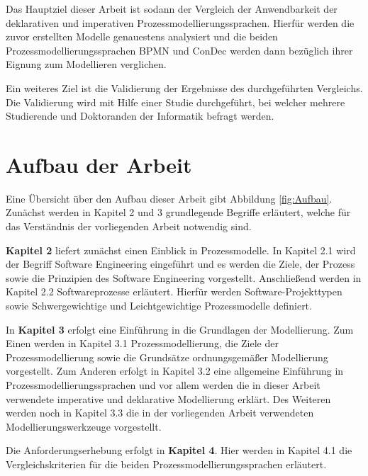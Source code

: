 Das Hauptziel dieser Arbeit ist sodann der Vergleich der Anwendbarkeit der deklarativen und imperativen Prozessmodellierungssprachen. Hierfür werden die zuvor erstellten Modelle genauestens analysiert und die beiden Prozessmodellierungssprachen BPMN und ConDec werden dann bezüglich ihrer Eignung zum Modellieren verglichen.\newline

Ein weiteres Ziel ist die Validierung der Ergebnisse des durchgeführten Vergleichs. Die Validierung wird mit Hilfe einer Studie durchgeführt, bei welcher mehrere Studierende und Doktoranden der Informatik befragt werden.\newline





\section{Aufbau der Arbeit}

Eine Übersicht über den Aufbau dieser Arbeit gibt Abbildung \ref{fig:Aufbau}.
Zunächst werden in Kapitel 2 und 3 grundlegende Begriffe erläutert, welche für das Verständnis der vorliegenden Arbeit notwendig sind.\newline

\textbf{Kapitel 2} liefert zunächst einen Einblick in Prozessmodelle. In Kapitel 2.1 wird der Begriff Software Engineering eingeführt und es werden die Ziele, der Prozess sowie die Prinzipien des Software Engineering vorgestellt. Anschließend werden in Kapitel 2.2 Softwareprozesse erläutert. Hierfür werden Software-Projekttypen sowie Schwergewichtige und Leichtgewichtige Prozessmodelle definiert.\newline

In \textbf{Kapitel 3} erfolgt eine Einführung in die Grundlagen der Modellierung. Zum Einen werden in Kapitel 3.1 Prozessmodellierung, die Ziele der Prozessmodellierung sowie die Grundsätze ordnungsgemäßer Modellierung vorgestellt. Zum Anderen erfolgt in Kapitel 3.2 eine allgemeine Einführung in Prozessmodellierungssprachen und vor allem werden die in dieser Arbeit verwendete imperative und deklarative Modellierung erklärt. Des Weiteren werden noch in Kapitel 3.3 die in der vorliegenden Arbeit verwendeten Modellierungswerkzeuge vorgestellt.\newline

Die Anforderungserhebung erfolgt in \textbf{Kapitel 4}. Hier werden in Kapitel 4.1 die Vergleichskriterien für die beiden Prozessmodellierungssprachen erläutert.\newline

